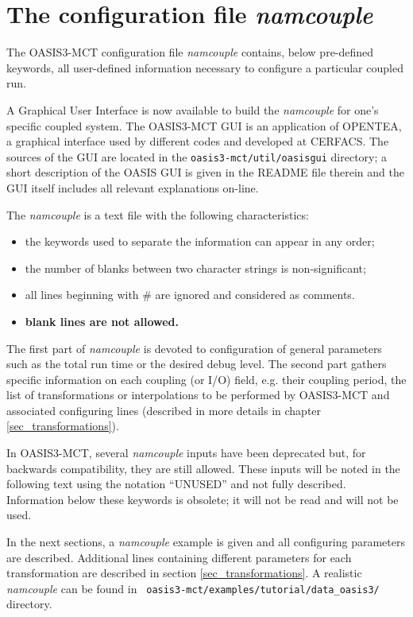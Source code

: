 \newpage
\chapter{The configuration file {\it namcouple}}
\label{sec_namcouple}

The OASIS3-MCT configuration file {\it namcouple} contains, below
pre-defined keywords, all user-defined information necessary to
configure a particular coupled run.

A Graphical User Interface is now available to build
the {\it namcouple} for one's specific coupled
system. The OASIS3-MCT GUI is an application of OPENTEA, a graphical
interface used by different codes and developed at CERFACS. The
sources of the GUI are located in the {\tt oasis3-mct/util/oasisgui}
directory; a short description of the OASIS GUI is given in the README
file therein and the GUI itself includes all relevant explanations
on-line.

The {\it namcouple} is a text file with the following characteristics:

\begin{itemize}
\item the keywords used to separate the information can appear in any
  order;
\item the number of blanks between two character strings is
  non-significant;
\item all lines beginning with \# are ignored and considered as
  comments.
\item {\bf blank lines are not allowed.}
\end{itemize}

The first part of {\it namcouple } is devoted to configuration of
general parameters such as the total run time or the desired debug level.  
The second part gathers specific
information on each coupling (or I/O) field, e.g. their coupling
period, the list of transformations or interpolations to be performed
by OASIS3-MCT and associated configuring lines (described in more
details in chapter \ref{sec_transformations}).

In OASIS3-MCT, several {\it namcouple} inputs have been deprecated
but, for backwards compatibility, they are still allowed.  These
inputs will be noted in the following text using the notation
``UNUSED'' and not fully described. Information below these keywords
is obsolete; it will not be read and will not be used.

In the next sections, a {\it namcouple} example is given and
all configuring parameters are described. Additional lines
containing different parameters for each transformation
are described in section \ref{sec_transformations}. A realistic {\it
  namcouple} can be found in {\tt
  oasis3-mct/examples/tutorial/data\_oasis3/} directory.

